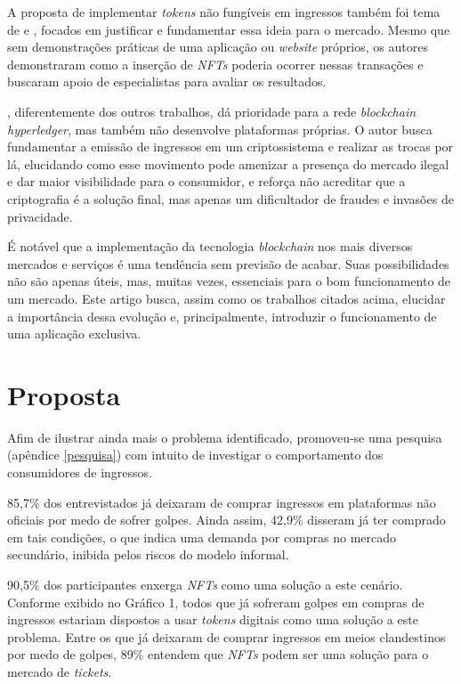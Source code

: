 {A proposta de implementar \textit{tokens} não fungíveis em ingressos também foi tema de  e , focados em justificar e fundamentar essa ideia para o mercado. Mesmo que sem demonstrações práticas de uma aplicação ou \textit{website} próprios, os autores demonstraram como a inserção de \textit{NFTs} poderia ocorrer nessas transações e buscaram apoio de especialistas para avaliar os resultados.

, diferentemente dos outros trabalhos, dá prioridade para a rede \textit{blockchain hyperledger}, mas também não desenvolve plataformas próprias. O autor busca fundamentar a emissão de ingressos em um criptossistema e realizar as trocas por lá, elucidando como esse movimento pode amenizar a presença do mercado ilegal e dar maior visibilidade para o consumidor, e reforça não acreditar que a criptografia é a solução final, mas apenas um dificultador de fraudes e invasões de privacidade.

É notável que a implementação da tecnologia \textit{blockchain} nos mais diversos mercados e serviços é uma tendência sem previsão de acabar. Suas possibilidades não são apenas úteis, mas, muitas vezes, essenciais para o bom funcionamento de um mercado. Este artigo busca, assim como os trabalhos citados acima, elucidar a importância dessa evolução e, principalmente, introduzir o funcionamento de uma aplicação exclusiva.

\section{\esp Proposta}

Afim de ilustrar ainda mais o problema identificado, promoveu-se uma pesquisa (apêndice \ref{pesquisa}) com intuito de investigar o comportamento dos consumidores de ingressos.

85,7\% dos entrevistados já deixaram de comprar ingressos em plataformas não oficiais por medo de sofrer golpes. Ainda assim, 42,9\% disseram já ter comprado em tais condições, o que indica uma demanda por compras no mercado secundário, inibida pelos riscos do modelo informal.

90,5\% dos participantes enxerga \textit{NFTs} como uma solução a este cenário. Conforme exibido no Gráfico 1, todos que já sofreram golpes em compras de ingressos estariam dispostos a usar \textit{tokens} digitais como uma solução a este problema. Entre os que já deixaram de comprar ingressos em meios clandestinos por medo de golpes, 89\% entendem que \textit{NFTs} podem ser uma solução para o mercado de \textit{tickets}.

}
